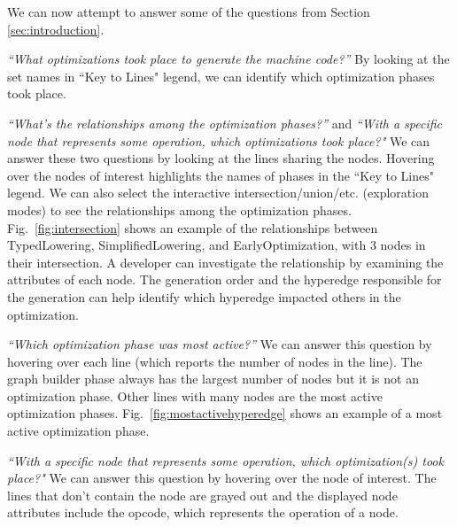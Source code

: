 \documentclass[runningheads]{llncs}
\begin{document}
We can now attempt to answer some of the questions from Section \ref{sec:introduction}.

\textit{``What optimizations took place to generate the machine code?”} By looking at the set names in ``Key to Lines" legend, we can  identify which optimization phases took place.

\textit{``What’s the relationships among the optimization phases?”} and \textit{``With a specific node that represents some operation, which optimizations took place?"} We can answer these two questions by looking at the lines sharing the nodes. Hovering over the nodes of interest highlights the names of phases in the ``Key to Lines" legend. We can also select the interactive  intersection/union/etc. (exploration modes) to see the relationships among the optimization phases. Fig.~\ref{fig:intersection} shows an example of the relationships between TypedLowering, SimplifiedLowering, and EarlyOptimization, with 3 nodes in their intersection. A developer can investigate the relationship by examining the attributes of each node. The generation order and the hyperedge responsible for the generation can help identify which hyperedge impacted others in the optimization.

\textit{``Which optimization phase was most active?”} We can answer this question by hovering over each line (which reports the number of nodes in the line). The graph builder phase always has the largest number of nodes but it is not an optimization phase. Other lines with many nodes are the most active optimization phases. Fig.~\ref{fig:mostactivehyperedge} shows an example of a most active optimization phase.

\textit{``With a specific node that represents some operation, which optimization(s) took place?"} We can answer this question by hovering over the node of interest. The lines that don't contain the node are grayed out and the displayed node attributes include the opcode, which represents the operation of a node.
\end{document}
